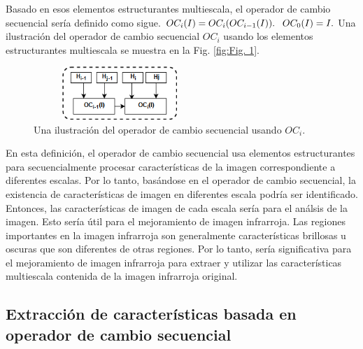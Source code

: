 \documentclass[a4paper, 11 pt, conference]{ieeeconf}      %
\begin{document}
Basado en esos elementos estructurantes multiescala, el operador de cambio secuencial ser\'ia definido como sigue.
$\\\\
OC_i(I) = OC_i(OC_{i-1}(I)).
$
$\\
OC_0(I) = I.\\\\
$
Una ilustraci\'on del operador de cambio secuencial $OC_i$ usando los elementos estructurantes multiescala se muestra en la Fig. \eqref{fig:Fig. 1}. 

\begin{figure}
    \centering
    \includegraphics[width=6.5cm,height=2cm,angle=0]{rsc/TOGF.png}
    \caption{Una ilustraci\'on del operador de cambio secuencial usando $OC_i$.}
    \label{fig:Fig. 1}
\end{figure}

En esta definici\'on, el operador de cambio secuencial usa elementos estructurantes para secuencialmente procesar caracter\'isticas de la imagen correspondiente a diferentes escalas. Por lo tanto, bas\'andose en el operador de cambio secuencial, la existencia de caracter\'isticas de imagen en diferentes escala podr\'ia ser identificado. Entonces, las caracter\'isticas de imagen de cada escala ser\'ia para el an\'alsis de la imagen. Esto ser\'ia \'util para el mejoramiento de imagen infrarroja.
Las regiones importantes en la imagen infrarroja son generalmente caracter\'isticas brillosas u oscuras que son diferentes de otras regiones. Por lo tanto, ser\'ia significativa para el mejoramiento de imagen infrarroja para extraer y utilizar las caracter\'isticas multiescala contenida de la imagen infrarroja original.

\subsection{Extracci\'on de caracter\'isticas basada en operador de cambio secuencial}
\end{document}
